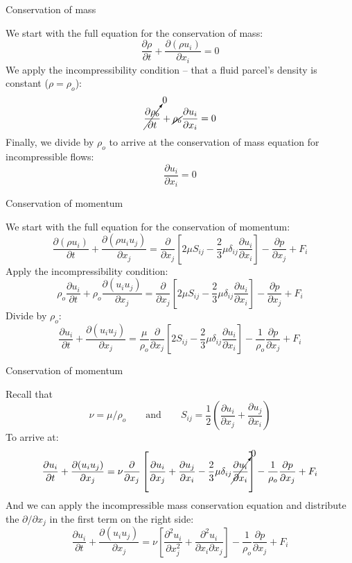 
\begin{frame}{Conservation of mass}

We start with the full equation for the conservation of mass:
$$\frac{\partial \rho}{\partial t} + \frac{\partial (\rho u_i)}{\partial x_i} = 0$$
We apply the incompressibility condition -- that a fluid parcel's density is constant ($\rho = \rho_o$):
$$\cancelto{0}{\frac{\partial \rho_o}{\partial t}} + \cancel{\rho_o}\frac{\partial u_i}{\partial x_i} = 0$$
Finally, we divide by $\rho_o$ to arrive at the conservation of mass equation for incompressible flows:
$$\boxed{\frac{\partial u_i}{\partial x_i} = 0}$$
\end{frame}


\begin{frame}{Conservation of momentum}

We start with the full equation for the conservation of momentum:
$$\frac{\partial (\rho u_i)}{\partial t} + \frac{\partial (\rho u_i u_j)}{\partial x_j} = \frac{\partial}{\partial x_j}\left[ 2\mu S_{ij} - \frac{2}{3}\mu \delta_{ij} \frac{\partial u_i}{\partial x_i}\right] - \frac{\partial p}{\partial x_j} + F_i$$
Apply the incompressibility condition:
$$\rho_o\frac{\partial u_i}{\partial t} + \rho_o\frac{\partial (u_i u_j)}{\partial x_j} = \frac{\partial}{\partial x_j}\left[ 2\mu S_{ij} - \frac{2}{3}\mu \delta_{ij} \frac{\partial u_i}{\partial x_i}\right] - \frac{\partial p}{\partial x_j} + F_i$$
Divide by $\rho_o$:
$$\frac{\partial u_i}{\partial t} + \frac{\partial (u_i u_j)}{\partial x_j} = \frac{\mu}{\rho_o} \frac{\partial}{\partial x_j}\left[ 2 S_{ij} - \frac{2}{3}\mu \delta_{ij} \frac{\partial u_i}{\partial x_i}\right] - \frac{1}{\rho_o}\frac{\partial p}{\partial x_j} + F_i$$
\end{frame}


\begin{frame}{Conservation of momentum}

Recall that 
$$\nu = \mu/\rho_o \qquad \mbox{and} \qquad S_{ij} = \frac{1}{2}\left(\frac{\partial u_i}{\partial x_j} + \frac{\partial u_j}{\partial x_i}\right)$$
To arrive at:
$$\frac{\partial u_i}{\partial t} + \frac{\partial (u_i u_j)}{\partial x_j} = \nu \frac{\partial}{\partial x_j}\left[\frac{\partial u_i}{\partial x_j} + \frac{\partial u_j}{\partial x_i} - \frac{2}{3}\mu \delta_{ij} \cancelto{0}{\frac{\partial u_i}{\partial x_i}} \right] - \frac{1}{\rho_o}\frac{\partial p}{\partial x_j} + F_i$$
And we can apply the incompressible mass conservation equation and distribute the $\partial/\partial x_j$ in the first term on the right side:
$$\frac{\partial u_i}{\partial t} + \frac{\partial (u_i u_j)}{\partial x_j} = \nu \left[\frac{\partial^2 u_i}{\partial x_j^2} + \frac{\partial^2 u_i}{\partial x_i\partial x_j} \right] - \frac{1}{\rho_o}\frac{\partial p}{\partial x_j} + F_i$$
\end{frame}


